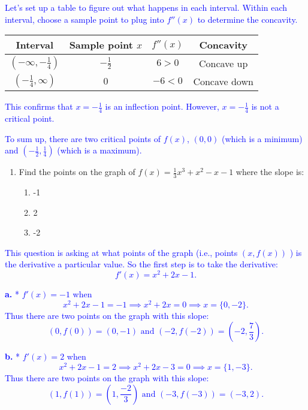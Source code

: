 \documentclass[
]{article}
\providecommand{\tightlist}{%
  \setlength{\itemsep}{0pt}\setlength{\parskip}{0pt}}
\begin{document}
\textcolor{blue}{Let's set up a table to figure out what happens in each interval. Within each interval, choose a sample point to plug into $f''(x)$ to determine the concavity.}

\textcolor{blue}{\begin{tabular}{|c|c|c|c|}
\hline
Interval & Sample point $x$ & $f''(x)$ & Concavity \\
\hline
$(-\infty, -\frac{1}{4})$ & $-\frac{1}{2}$ & $6>0$ & Concave up \\
$(-\frac{1}{4}, \infty)$ & $0$ & $-6<0$ &  Concave down\\
\hline
\end{tabular}}

\textcolor{blue}{This confirms that $x = -\frac{1}{4}$ is an inflection point. However, $x = -\frac{1}{4}$ is not a critical point.}

\textcolor{blue}{To sum up, there are two critical points of $f(x)$, $(0, 0)$ (which is a minimum) and $(-\frac{1}{2}, \frac{1}{4})$ (which is a maximum).}

\hfill\break

\begin{enumerate}
\def\labelenumi{\arabic{enumi}.}
\setcounter{enumi}{2}
\item
  Find the points on the graph of \(f(x) = \frac{1}{3} x^3 + x^2 - x - 1\) where the slope is:

  \begin{enumerate}
  \def\labelenumii{\alph{enumii}.}
  \tightlist
  \item
    -1
  \item
    2
  \item
    -2
  \end{enumerate}
\end{enumerate}

\textcolor{blue}{This question is asking at what points of the graph (i.e., points $(x,f(x))$ ) is the derivative a particular value. So the first step is to take the derivative:
$$f'(x) = x^2 + 2 x - 1.$$}

\textcolor{blue}{\textbf{a.}
* $f'(x) = -1$ when 
$$ x^2 + 2x - 1 = -1 \implies x^2 + 2x = 0 \implies x = \{ 0 , -2\}.$$
Thus there are two points on the graph with this slope: 
$$(0, f(0)) = (0,-1) \text{ and }  (-2,f(-2)) = \left( -2, \frac{7}{3}\right).$$}

\textcolor{blue}{\textbf{b.}
* $f'(x) = 2$ when
$$ x^2 + 2x - 1 = 2 \implies x^2 + 2x - 3 = 0 \implies x = \{ 1 , -3\}.$$
Thus there are two points on the graph with this slope: 
$$(1, f(1)) = \left( 1,\frac{-2}{3} \right) \text{ and }  (-3,f(-3)) = ( -3,2).$$}
\end{document}
